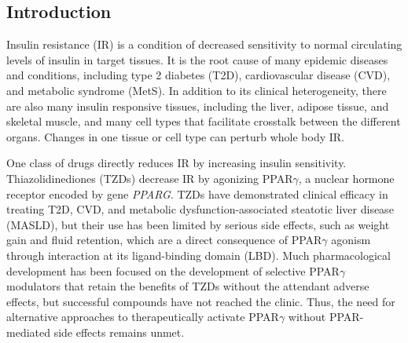 \begin{dissertationintroduction}
    
\setcounter{chapter}{0}
\chapter*{Introduction}

\label{chap:introduction}

Insulin resistance (IR) is a condition of decreased sensitivity to normal circulating levels of insulin in target tissues. It is the root cause of many epidemic diseases and conditions, including type 2 diabetes (T2D), cardiovascular disease (CVD), and metabolic syndrome (MetS)\cite{James2021-vu,Adeva-Andany2019-df,Park2024-da}. In addition to its clinical heterogeneity, there are also many insulin responsive tissues, including the liver, adipose tissue, and skeletal muscle, and many cell types that facilitate crosstalk between the different organs. Changes in one tissue or cell type can perturb whole body IR\cite{James2021-vu}.  

One class of drugs directly reduces IR by increasing insulin sensitivity. Thiazolidinediones (TZDs) decrease IR by agonizing PPAR$\gamma$\cite{Yki-Jarvinen2004-bc}, a nuclear hormone receptor encoded by gene \textit{PPARG}. TZDs have demonstrated clinical efficacy in treating T2D, CVD, and metabolic dysfunction-associated steatotic liver disease (MASLD), but their use has been limited by serious side effects, such as weight gain and fluid retention, which are a direct consequence of PPAR$\gamma$ agonism through interaction at its ligand-binding domain (LBD)\cite{Kernan2016-as,Musso2017-xi,Arnold2019-kq}. Much pharmacological development has been focused on the development of selective PPAR$\gamma$ modulators that retain the benefits of TZDs without the attendant adverse effects, but successful compounds have not reached the clinic\cite{DePaoli2014-lp,Higgins2010-yv}. Thus, the need for alternative approaches to therapeutically activate PPAR$\gamma$ without PPAR-mediated side effects remains unmet.  


\end{dissertationintroduction}
